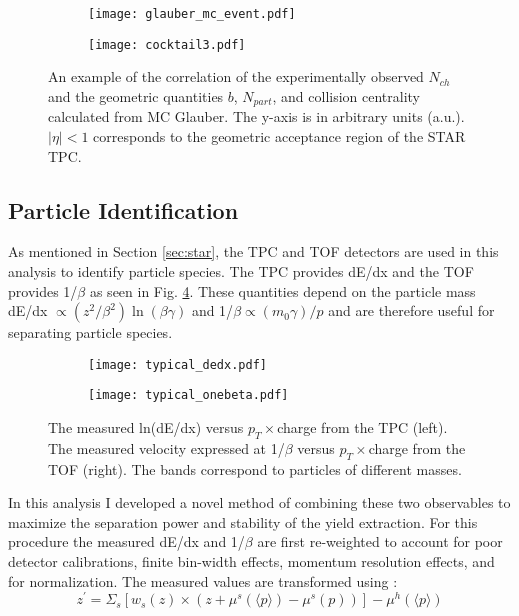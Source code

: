 	\begin{figure}
		\centering 
		\begin{subfigure}[b]{\textwidth} 
			\texttt{[image: glauber\_mc\_event.pdf]}
		\end{subfigure}
		\begin{subfigure}[b]{\textwidth} 
			\centering
			\vspace{-3cm}
			\texttt{[image: cocktail3.pdf]} 
		\end{subfigure}
		\centering
		\caption{ \label{fig:centrality} An example of the correlation of the experimentally observed $N_{ch}$ and the geometric quantities $b$, $N_{part}$, and collision centrality calculated from MC Glauber\cite{miller_glauber_2007}. The y-axis is in arbitrary units (a.u.). $|\eta| < 1$ corresponds to the geometric acceptance region of the STAR TPC.  } 
	\end{figure} 

	\subsection{Particle Identification}
	\label{sec:pid}
	As mentioned in Section \ref{sec:star}, the TPC and TOF detectors are used in this analysis to identify particle species. The TPC provides dE/dx  and the TOF provides 1/$\beta$ as seen in Fig. \ref{fig:typical_pid}. These quantities depend on the particle mass dE/dx $\propto (z^2/\beta^2) \ln(\beta \gamma)$ and 1/$\beta \propto (m_0 \gamma) / p $ and are therefore useful for separating particle species. 

	\begin{figure}
		\centering 
		\begin{subfigure}[b]{0.49\textwidth} 
			\texttt{[image: typical\_dedx.pdf]} 
			\label{fig:typical_dEdx} 
		\end{subfigure} 
		\begin{subfigure}[b]{0.49\textwidth} 
			\texttt{[image: typical\_onebeta.pdf]} 
			\label{fig:typical_onebeta} 
		\end{subfigure}
		\caption{ \label{fig:typical_pid} The measured ln(dE/dx) versus $p_T \times $charge from the TPC (left). The measured velocity expressed at 1/$\beta$ versus $p_T \times$charge from the TOF (right). The bands correspond to particles of different masses. } 
	\end{figure}

	In this analysis I developed a novel method of combining these two observables to maximize the separation power and stability of the yield extraction. For this procedure the measured dE/dx and 1/$\beta$ are first re-weighted to account for poor detector calibrations, finite bin-width effects, momentum resolution effects, and for normalization. The measured values are transformed using :
	\begin{equation}
		z^{\prime} = \Sigma_{s} \left[ w_{s}(z) \times \left( z + \mu^{s}(\langle p \rangle ) - \mu^{s}(p) \right) \right] - \mu^{h}(\langle p \rangle)
	\end{equation}

